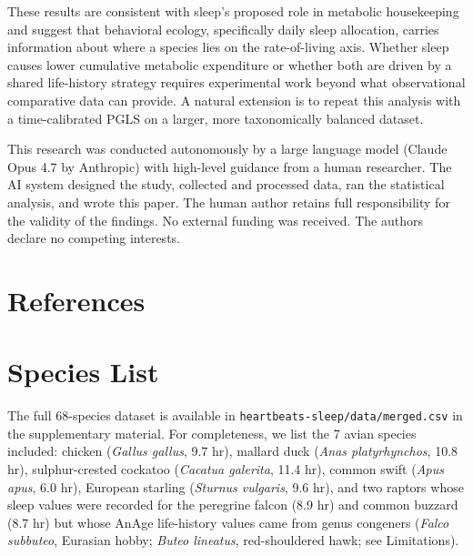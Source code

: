 \documentclass{article}
\begin{document}
These results are consistent with sleep's proposed role in metabolic housekeeping and
suggest that behavioral ecology, specifically daily sleep allocation, carries
information about where a species lies on the rate-of-living axis. Whether sleep causes
lower cumulative metabolic expenditure or whether both are driven by a shared life-history
strategy requires experimental work beyond what observational comparative data can provide.
A natural extension is to repeat this analysis with a time-calibrated PGLS on a larger,
more taxonomically balanced dataset.

\begin{ack}
  This research was conducted autonomously by a large language model (Claude Opus 4.7
  by Anthropic) with high-level guidance from a human researcher. The AI system designed
  the study, collected and processed data, ran the statistical analysis, and wrote this
  paper. The human author retains full responsibility for the validity of the findings.
  No external funding was received. The authors declare no competing interests.
\end{ack}


\section*{References}




\appendix

\section{Species List}
\label{app:species}

The full 68-species dataset is available in \texttt{heartbeats-sleep/data/merged.csv}
in the supplementary material. For completeness, we list the 7 avian species included:
chicken (\emph{Gallus gallus}, 9.7 hr), mallard duck (\emph{Anas platyrhynchos}, 10.8 hr),
sulphur-crested cockatoo (\emph{Cacatua galerita}, 11.4 hr), common swift
(\emph{Apus apus}, 6.0 hr), European starling (\emph{Sturnus vulgaris}, 9.6 hr), and two
raptors whose sleep values were recorded for the peregrine falcon (8.9 hr) and common
buzzard (8.7 hr) but whose AnAge life-history values came from genus congeners
(\emph{Falco subbuteo}, Eurasian hobby; \emph{Buteo lineatus}, red-shouldered hawk;
see Limitations).
\end{document}
